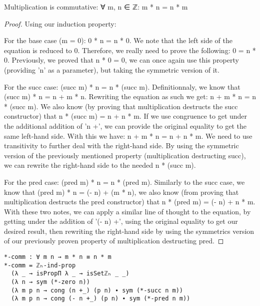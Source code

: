 \begin{theorem}
  Multiplication is commutative: ∀ m, n ∈ ℤ: m * n = n * m
\end{theorem}

\begin{proof}
  Using our induction property:

  For the base case (m = 0): 0 * n = n * 0. We note that the left side of the equation is reduced to 0. Therefore, we really need to prove the following: 0 = n * 0. Previously, we proved that n * 0 = 0, we can once again use this property (providing 'n' as a parameter), but taking the symmetric version of it.

  For the succ case: (succ m) * n = n * (succ m). Definitionnaly, we know that (succ m) * n = n + m * n. Rewriting the equation as such we get: n + m * n = n * (succ m). We also know (by proving that multiplication destructs the succ constructor) that n * (succ m) = n + n * m. If we use congruence to get under the additional addition of 'n +', we can provide the original equality to get the same left-hand side. With this we have: n + m * n = n + n * m. We need to use transitivity to further deal with the right-hand side. By using the symmetric version of the previously mentioned property (multiplication destructing succ), we can rewrite the right-hand side to the needed n * (succ m).

  For the pred case: (pred m) * n = n * (pred m). Similarly to the succ case, we know that (pred m) * n = (- n) + (m * n), we also know (from proving that multiplication destructs the pred constructor) that n * (pred m) = (- n) + n * m. With these two notes, we can apply a similar line of thought to the equation, by getting under the addition of '(- n) +', using the original equality to get our desired result, then rewriting the right-hand side by using the symmetrics version of our previously proven property of multiplication destructing pred.
\end{proof}

\begin{listing}[H]
\begin{verbatim}
*-comm : ∀ m n → m * n ≡ n * m
*-comm = ℤₕ-ind-prop
  (λ _ → isPropΠ λ _ → isSetℤₕ _ _)
  (λ n → sym (*-zero n))
  (λ m p n → cong (n +_) (p n) ∙ sym (*-succ n m))
  (λ m p n → cong (- n +_) (p n) ∙ sym (*-pred n m))
\end{verbatim}
\caption{Agda proof of multiplication being commutative}
\end{listing}

